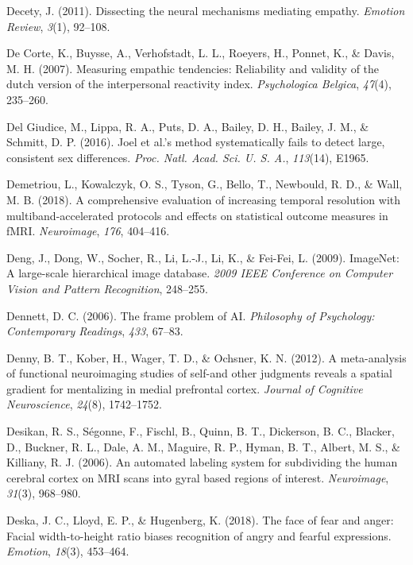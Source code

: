 \documentclass[11pt,american,]{memoir} %
\begin{document}
\leavevmode\hypertarget{ref-decety2011dissecting}{}%
Decety, J. (2011). Dissecting the neural mechanisms mediating empathy. \emph{Emotion Review}, \emph{3}(1), 92--108.

\leavevmode\hypertarget{ref-de2007measuring}{}%
De Corte, K., Buysse, A., Verhofstadt, L. L., Roeyers, H., Ponnet, K., \& Davis, M. H. (2007). Measuring empathic tendencies: Reliability and validity of the dutch version of the interpersonal reactivity index. \emph{Psychologica Belgica}, \emph{47}(4), 235--260.

\leavevmode\hypertarget{ref-Del_Giudice2016-ns}{}%
Del Giudice, M., Lippa, R. A., Puts, D. A., Bailey, D. H., Bailey, J. M., \& Schmitt, D. P. (2016). Joel et al.'s method systematically fails to detect large, consistent sex differences. \emph{Proc. Natl. Acad. Sci. U. S. A.}, \emph{113}(14), E1965.

\leavevmode\hypertarget{ref-Demetriou2018-xp}{}%
Demetriou, L., Kowalczyk, O. S., Tyson, G., Bello, T., Newbould, R. D., \& Wall, M. B. (2018). A comprehensive evaluation of increasing temporal resolution with multiband-accelerated protocols and effects on statistical outcome measures in fMRI. \emph{Neuroimage}, \emph{176}, 404--416.

\leavevmode\hypertarget{ref-Deng2009-bp}{}%
Deng, J., Dong, W., Socher, R., Li, L.-J., Li, K., \& Fei-Fei, L. (2009). ImageNet: A large-scale hierarchical image database. \emph{2009 IEEE Conference on Computer Vision and Pattern Recognition}, 248--255.

\leavevmode\hypertarget{ref-Dennett2006-el}{}%
Dennett, D. C. (2006). The frame problem of AI. \emph{Philosophy of Psychology: Contemporary Readings}, \emph{433}, 67--83.

\leavevmode\hypertarget{ref-denny2012meta}{}%
Denny, B. T., Kober, H., Wager, T. D., \& Ochsner, K. N. (2012). A meta-analysis of functional neuroimaging studies of self-and other judgments reveals a spatial gradient for mentalizing in medial prefrontal cortex. \emph{Journal of Cognitive Neuroscience}, \emph{24}(8), 1742--1752.

\leavevmode\hypertarget{ref-Desikan2006-gh}{}%
Desikan, R. S., Ségonne, F., Fischl, B., Quinn, B. T., Dickerson, B. C., Blacker, D., Buckner, R. L., Dale, A. M., Maguire, R. P., Hyman, B. T., Albert, M. S., \& Killiany, R. J. (2006). An automated labeling system for subdividing the human cerebral cortex on MRI scans into gyral based regions of interest. \emph{Neuroimage}, \emph{31}(3), 968--980.

\leavevmode\hypertarget{ref-Deska2018-hx}{}%
Deska, J. C., Lloyd, E. P., \& Hugenberg, K. (2018). The face of fear and anger: Facial width-to-height ratio biases recognition of angry and fearful expressions. \emph{Emotion}, \emph{18}(3), 453--464.
\end{document}
